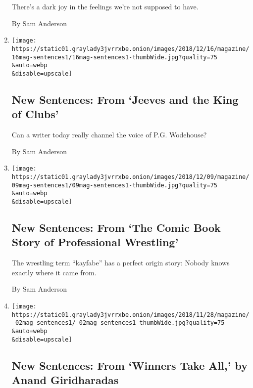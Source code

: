 \begin{enumerate}
  There's a dark joy in the feelings we're not supposed to have.

  By Sam Anderson
\item
  \href{/2018/12/13/magazine/new-sentences-from-jeeves-and-the-king-of-clubs.html}{}

  \texttt{[image: https://static01.graylady3jvrrxbe.onion/images/2018/12/16/magazine/16mag-sentences1/16mag-sentences1-thumbWide.jpg?quality=75\\\&auto=webp\\\&disable=upscale]}

  \hypertarget{new-sentences-from-jeeves-and-the-king-of-clubs}{%
  \subsection{New Sentences: From `Jeeves and the King of
  Clubs'}\label{new-sentences-from-jeeves-and-the-king-of-clubs}}

  Can a writer today really channel the voice of P.G. Wodehouse?

  By Sam Anderson
\item
  \href{/2018/12/06/magazine/new-sentences-from-the-comic-book-story-of-professional-wrestling.html}{}

  \texttt{[image: https://static01.graylady3jvrrxbe.onion/images/2018/12/09/magazine/09mag-sentences1/09mag-sentences1-thumbWide.jpg?quality=75\\\&auto=webp\\\&disable=upscale]}

  \hypertarget{new-sentences-from-the-comic-book-story-of-professional-wrestling}{%
  \subsection{New Sentences: From `The Comic Book Story of Professional
  Wrestling'}\label{new-sentences-from-the-comic-book-story-of-professional-wrestling}}

  The wrestling term ``kayfabe'' has a perfect origin story: Nobody
  knows exactly where it came from.

  By Sam Anderson
\item
  \href{/2018/11/29/magazine/new-sentences-from-winners-take-all-by-anand-giridharadas.html}{}

  \texttt{[image: https://static01.graylady3jvrrxbe.onion/images/2018/11/28/magazine/-02mag-sentences1/-02mag-sentences1-thumbWide.jpg?quality=75\\\&auto=webp\\\&disable=upscale]}

  \hypertarget{new-sentences-from-winners-take-all-by-anand-giridharadas}{%
  \subsection{New Sentences: From `Winners Take All,' by Anand
  Giridharadas}\label{new-sentences-from-winners-take-all-by-anand-giridharadas}}


\end{enumerate}
